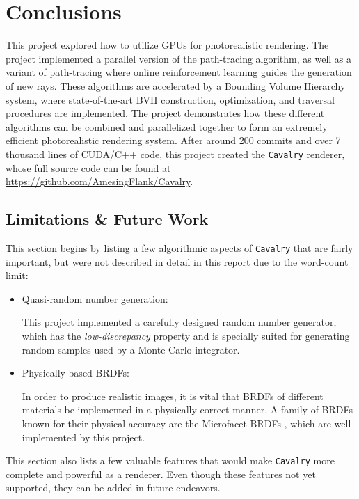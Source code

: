 \chapter{Conclusions}

This project explored how to utilize GPUs for photorealistic rendering. The project implemented a parallel version of the path-tracing algorithm, as well as a variant of path-tracing where online reinforcement learning guides the generation of new rays. These algorithms are accelerated by a Bounding Volume Hierarchy system, where state-of-the-art BVH construction, optimization, and traversal procedures are implemented. The project demonstrates how these different algorithms can be combined and parallelized together to form an extremely efficient photorealistic rendering system. After around 200 commits and over 7 thousand lines of CUDA/C++ code, this project created the \texttt{Cavalry} renderer, whose full source code can be found at \url{https://github.com/AmesingFlank/Cavalry}.

\section{Limitations \& Future Work}
This section begins by listing a few algorithmic aspects of \texttt{Cavalry} that are fairly important, but were not described in detail in this report due to the word-count limit:
\begin{itemize}
    \item Quasi-random number generation:
    
    This project implemented a carefully designed random number generator, which has the \textit{low-discrepancy} property and is specially suited for generating random samples used by a Monte Carlo integrator. 

    \item Physically based BRDFs:
    
    In order to produce realistic images, it is vital that BRDFs of different materials be implemented in a physically correct manner. A family of BRDFs known for their physical accuracy are the Microfacet BRDFs \cite{cook1982reflectance}, which are well implemented by this project. 

\end{itemize}

\label{section limitations}
This section also lists a few valuable features that would make \texttt{Cavalry} more complete and powerful as a renderer. Even though these features not yet supported, they can be added in future endeavors.


